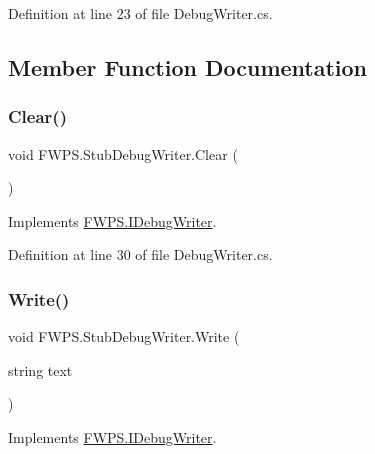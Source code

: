 Definition at line 23 of file Debug\+Writer.\+cs.



\subsection{Member Function Documentation}
\mbox{\label{class_f_w_p_s_1_1_stub_debug_writer_a18682f40a0653f9ec10e49eadb99af57}} 
\subsubsection{\texorpdfstring{Clear()}{Clear()}}
{\footnotesize\ttfamily void F\+W\+P\+S.\+Stub\+Debug\+Writer.\+Clear (\begin{DoxyParamCaption}{ }\end{DoxyParamCaption})}



Implements \mbox{\hyperlink{interface_f_w_p_s_1_1_i_debug_writer_afe3fafb517c1a3ba057d6d3ed4da0285}{F\+W\+P\+S.\+I\+Debug\+Writer}}.



Definition at line 30 of file Debug\+Writer.\+cs.

\mbox{\label{class_f_w_p_s_1_1_stub_debug_writer_a7c7382228333a504cce7ae7fc8bdd25f}} 
\subsubsection{\texorpdfstring{Write()}{Write()}}
{\footnotesize\ttfamily void F\+W\+P\+S.\+Stub\+Debug\+Writer.\+Write (\begin{DoxyParamCaption}\item[{string}]{text }\end{DoxyParamCaption})}



Implements \mbox{\hyperlink{interface_f_w_p_s_1_1_i_debug_writer_a826f82ffa90498afa817f5eef274d5dc}{F\+W\+P\+S.\+I\+Debug\+Writer}}.



